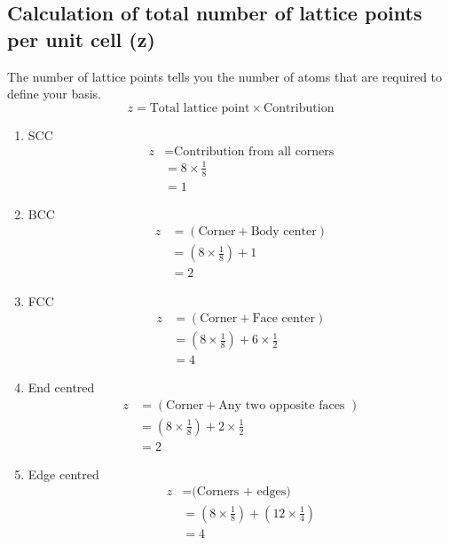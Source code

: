 	\subsection{Calculation of total number of lattice points per unit cell (z)}
	The number of lattice points tells you the number of atoms that are required to define your basis.
	\begin{equation*}
	z= \text{Total lattice point} \times \text{Contribution}
	\end{equation*}
\begin{enumerate}
		\item SCC
		\begin{align*}
		z&= \text{Contribution from all corners}\\
		&=8 \times \frac{1}{8}\\
		&=1
		\end{align*}
		\item BCC
		\begin{align*}
		z&= (\text{Corner} + \text{Body center})\\
		&= \left( 8 \times \frac{1}{8}\right)  + 1\\
		&= 2
		\end{align*}
		\item FCC
		\begin{align*}
		z&= (\text{Corner} + \text{Face center})\\
		&= \left( 8 \times \frac{1}{8}\right)  + 6 \times \frac{1}{2}\\
		&= 4
		\end{align*}
		\item End centred
		\begin{align*}
		z&= (\text{Corner} + \text{Any two opposite faces })\\
		&= \left( 8 \times \frac{1}{8}\right)  + 2 \times \frac{1}{2}\\
		&=2
		\end{align*}
		\item Edge centred
		\begin{align*}
		z&= \text{(Corners + edges) }\\
		&= \left( 8 \times \frac{1}{8}\right)  + \left( 12 \times \frac{1}{4}\right) \\
		&=4\\
		\end{align*}
	\end{enumerate}
